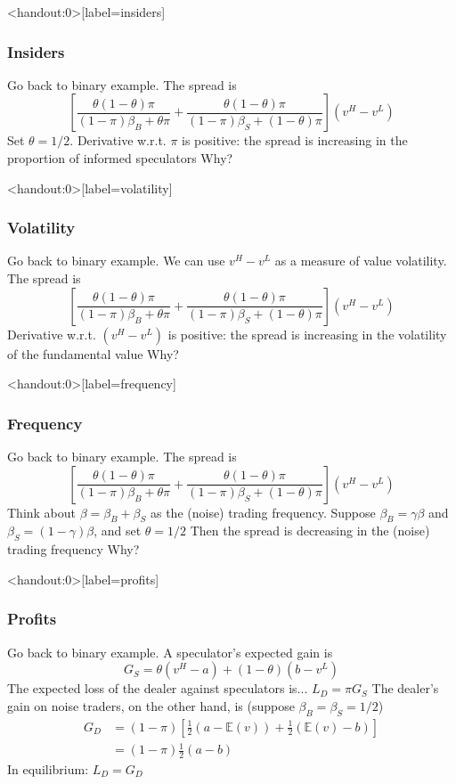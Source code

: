 \documentclass[english,10pt]{beamer}
\begin{document}
\begin{frame}<handout:0>[label=insiders]
	\frametitle{Insiders}
	Go back to binary example. The spread is 
	\[
	\left[ \frac{\theta(1-\theta) \pi}{(1-\pi)\beta_B+\theta\pi}+\frac{\theta(1-\theta) \pi}{(1-\pi)\beta_S+(1-\theta)\pi}\right](v^H-v^L)
	\]
	Set $\theta=1/2$. Derivative w.r.t. $\pi$ is positive: the spread is increasing in the proportion of informed speculators
	\quad
	Why?
	\hyperlink{insights}{}
\end{frame}


\begin{frame}<handout:0>[label=volatility]
	\frametitle{Volatility}
	Go back to binary example. We can use $v^H-v^L$ as a measure of value volatility. The spread is 
	\[
	\left[ \frac{\theta(1-\theta) \pi}{(1-\pi)\beta_B+\theta\pi}+\frac{\theta(1-\theta) \pi}{(1-\pi)\beta_S+(1-\theta)\pi}\right](v^H-v^L)
	\]
	Derivative w.r.t. $(v^H-v^L)$ is positive: the spread is increasing in the volatility of the fundamental value
	\quad
	Why?
	\hyperlink{insights}{}
\end{frame}


\begin{frame}<handout:0>[label=frequency]
	\frametitle{Frequency}
	Go back to binary example. The spread is 
	\[
	\left[ \frac{\theta(1-\theta) \pi}{(1-\pi)\beta_B+\theta\pi}+\frac{\theta(1-\theta) \pi}{(1-\pi)\beta_S+(1-\theta)\pi}\right](v^H-v^L)
	\]
	Think about $\beta=\beta_{B}+\beta_{S}$ as the (noise) trading frequency. Suppose $\beta_{B}=\gamma \beta$ and $\beta_{S}= (1-\gamma) \beta$, and set $\theta=1/2$
	\quad
	Then the spread is decreasing in the (noise) trading frequency
	\quad
	Why?
	\hyperlink{insights}{}
\end{frame}


\begin{frame}<handout:0>[label=profits]
	\frametitle{Profits}
	Go back to binary example. A speculator's expected gain is
	\[
	G_{S} = \theta (v^{H} - a) + (1-\theta) (b-v^{L})
	\]
	The expected loss of the dealer against speculators is... \pause $L_{D} = \pi G_{S}$
	The dealer's gain on noise traders, on the other hand, is (suppose $\beta_B=\beta_S=1/2$)
	\begin{align*}
	G_{D} 
	& = (1-\pi) [ \frac{1}{2} (a-\mathbb{E}(v)) + \frac{1}{2}(\mathbb{E}(v) - b)] \\
	& = (1-\pi) \frac{1}{2} (a-b)
	\end{align*}
	In equilibrium: $L_{D} = G_{D}$
	\hyperlink{insights}{}
\end{frame}
\end{document}
